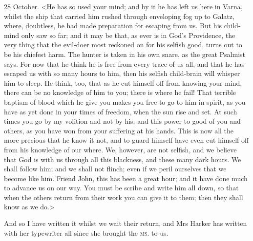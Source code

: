 \begin{diary}{28 October.}
<He has so used your mind; and by it he has left us here in Varna, whilst the ship that carried him rushed through enveloping fog up to Galatz, where, doubtless, he had made preparation for escaping from us. But his child-mind only saw so far; and it may be that, as ever is in God's Providence, the very thing that the evil-doer most reckoned on for his selfish good, turns out to be his chiefest harm. The hunter is taken in his own snare, as the great Psalmist says. For now that he think he is free from every trace of us all, and that he has escaped us with so many hours to him, then his selfish child-brain will whisper him to sleep. He think, too, that as he cut himself off from knowing your mind, there can be no knowledge of him to you; there is where he fail! That terrible baptism of blood which he give you makes you free to go to him in spirit, as you have as yet done in your times of freedom, when the sun rise and set. At such times you go by my volition and not by his; and this power to good of you and others, as you have won from your suffering at his hands. This is now all the more precious that he know it not, and to guard himself have even cut himself off from his knowledge of our where. We, however, are not selfish, and we believe that God is with us through all this blackness, and these many dark hours. We shall follow him; and we shall not flinch; even if we peril ourselves that we become like him. Friend John, this has been a great hour; and it have done much to advance us on our way. You must be scribe and write him all down, so that when the others return from their work you can give it to them; then they shall know as we do.>

And so I have written it whilst we wait their return, and Mrs Harker has written with her typewriter all since she brought the \textsc{ms}. to us.
\end{diary}